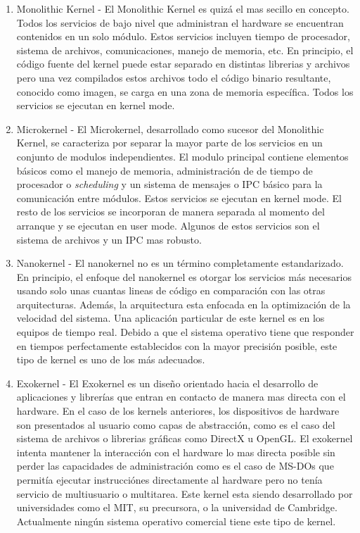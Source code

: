 \begin{enumerate}
\item Monolithic Kernel - El Monolithic Kernel es quizá el mas secillo en
  concepto. Todos los servicios de bajo nivel que administran el hardware se
  encuentran contenidos en un solo módulo. Estos servicios incluyen tiempo de
  procesador, sistema de archivos, comunicaciones, manejo de memoria, etc.  En
  principio, el código fuente del kernel puede estar separado en distintas
  librerias y archivos pero una vez compilados estos archivos todo el código
  binario resultante, conocido como imagen, se carga en una zona de memoria
  específica. Todos los servicios se ejecutan en kernel mode.
\item Microkernel - El Microkernel, desarrollado como sucesor del Monolithic
  Kernel, se caracteriza por separar la mayor parte de los servicios en un
  conjunto de modulos independientes. El modulo principal contiene elementos
  básicos como el manejo de memoria, administración de de tiempo de procesador o
  \emph{scheduling} y un sistema de mensajes o IPC básico para la comunicación
  entre módulos.  Estos servicios se ejecutan en kernel mode. El resto de los
  servicios se incorporan de manera separada al momento del arranque y se
  ejecutan en user mode. Algunos de estos servicios son el sistema de archivos y
  un IPC mas robusto.
\item Nanokernel - El nanokernel no es un término completamente
  estandarizado. En principio, el enfoque del nanokernel es otorgar los
  servicios más necesarios usando solo unas cuantas lineas de código en
  comparación con las otras arquitecturas. Además, la arquitectura esta
  enfocada en la optimización de la velocidad del sistema. Una aplicación
  particular de este kernel es en los equipos de tiempo real. Debido a que el
  sistema operativo tiene que responder en tiempos perfectamente establecidos
  con la mayor precisión posible, este tipo de kernel es uno de los más adecuados.
\item Exokernel - El Exokernel es un diseño orientado hacia el desarrollo de
  aplicaciones y librerías que entran en contacto de manera mas directa con el
  hardware. En el caso de los kernels anteriores, los dispositivos de hardware
  son presentados al usuario como capas de abstracción, como es el caso del
  sistema de archivos o librerias gráficas como DirectX u OpenGL. El exokernel
  intenta mantener la interacción con el hardware lo mas directa posible sin
  perder las capacidades de administración como es el caso de MS-DOs que permitía
  ejecutar instrucciónes directamente al hardware pero no tenía servicio de
  multiusuario o multitarea. Este kernel esta siendo desarrollado por
  universidades como el MIT, su precursora, o la universidad de
  Cambridge. Actualmente ningún sistema operativo comercial tiene este tipo de
  kernel.
\end{enumerate}

